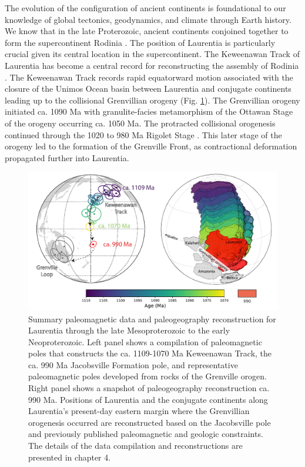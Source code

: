 The evolution of the configuration of ancient continents is foundational to our knowledge of global tectonics, geodynamics, and climate through Earth history. We know that in the late Proterozoic, ancient continents conjoined together to form the supercontinent Rodinia \citep[e.g.][]{Li2008a, Swanson-Hysell2021c, Evans2021b}. The position of Laurentia is particularly crucial given its central location in the supercontinent. The Keweenawan Track of Laurentia has become a central record for reconstructing the assembly of Rodinia \citep{Evans2021b}. The Keweenawan Track records rapid equatorward motion associated with the closure of the Unimos Ocean basin between Laurentia and conjugate continents leading up to the collisional Grenvillian orogeny (Fig. \ref{fig:abstract_paleogeography}). The Grenvillian orogeny initiated ca. 1090 Ma with granulite-facies metamorphism of the Ottawan Stage of the orogeny occurring ca. 1050 Ma. The protracted collisional orogenesis continued through the 1020 to 980 Ma Rigolet Stage \citep{Rivers2008a, Rivers2012b, Swanson-Hysell2023a}. This later stage of the orogeny led to the formation of the Grenville Front, as contractional deformation propagated further into Laurentia. 

\begin{figure}[h!]
    \centering
    \includegraphics[width=\textwidth]{figure/pole_summary.pdf}
    \caption[Summary paleomagnetic poles and associated paleogeography reconstruction for Laurentia and some of its conjugate continents through the late Mesoproterozoic to the early Neoproterozoic.]{Summary paleomagnetic data and paleogeography reconstruction for Laurentia through the late Mesoproterozoic to the early Neoproterozoic. Left panel shows a compilation of paleomagnetic poles that constructs the ca. 1109-1070 Ma Keweenawan Track, the ca. 990 Ma Jacobsville Formation pole, and representative paleomagnetic poles developed from rocks of the Grenville orogen. Right panel shows a snapshot of paleogeography reconstruction ca. 990 Ma. Positions of Laurentia and the conjugate continents along Laurentia's present-day eastern margin where the Grenvillian orogenesis occurred are reconstructed based on the Jacobsville pole and previously published paleomagnetic and geologic constraints. The details of the data compilation and reconstructions are presented in chapter 4.}
    \label{fig:abstract_paleogeography}
\end{figure}


